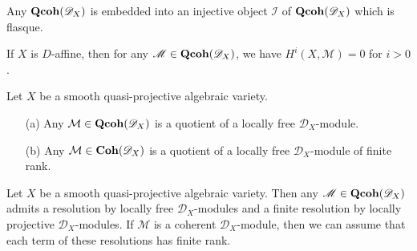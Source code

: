 \begin{proposition}\label{D-module qcoh module flasque resolution}
Any $\mathbf{Qcoh}(\mathscr{D}_X)$ is embedded into an injective object $\mathscr{I}$ of $\mathbf{Qcoh}(\mathscr{D}_X)$ which is flasque.
\end{proposition}

\begin{corollary}\label{D-module cohomology trivial for D-affine}
If $X$ is $D$-affine, then for any $\mathscr{M}\in\mathbf{Qcoh}(\mathscr{D}_X)$, we have $H^i(X,\mathscr{M})=0$ for $i>0$.
\end{corollary}

\begin{proposition}\label{D-module quotient of locally free on quasi-proj}
Let $X$ be a smooth quasi-projective algebraic variety.
\begin{enumerate}
    \item[(a)] Any $\mathcal{M}\in\mathbf{Qcoh}(\mathscr{D}_X)$ is a quotient of a locally free $\mathscr{D}_X$-module.
    \item[(b)] Any $\mathcal{M}\in\mathbf{Coh}(\mathscr{D}_X)$ is a quotient of a locally free $\mathscr{D}_X$-module of finite rank.
\end{enumerate}
\end{proposition}

\begin{corollary}\label{D-module resolution by locally free and projective on quasi-proj}
Let $X$ be a smooth quasi-projective algebraic variety. Then any $\mathscr{M}\in\mathbf{Qcoh}(\mathscr{D}_X)$ admits a resolution by locally free $\mathscr{D}_X$-modules and a finite resolution by locally projective $\mathscr{D}_X$-modules. If $\mathscr{M}$ is a coherent $\mathscr{D}_X$-module, then we can assume that each term of these resolutions has finite rank.
\end{corollary}

